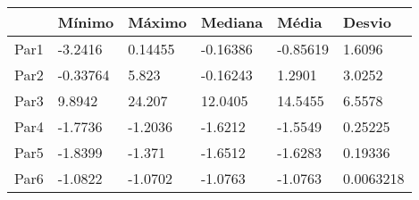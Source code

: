 \begin{tabular}{llllll}
& Mínimo & Máximo & Mediana & Média & Desvio \\ 
\hline 
Par1 & -3.2416 & 0.14455 & -0.16386 & -0.85619 & 1.6096 \\ 
Par2 & -0.33764 & 5.823 & -0.16243 & 1.2901 & 3.0252 \\ 
Par3 & 9.8942 & 24.207 & 12.0405 & 14.5455 & 6.5578 \\ 
Par4 & -1.7736 & -1.2036 & -1.6212 & -1.5549 & 0.25225 \\ 
Par5 & -1.8399 & -1.371 & -1.6512 & -1.6283 & 0.19336 \\ 
Par6 & -1.0822 & -1.0702 & -1.0763 & -1.0763 & 0.0063218 \\ 
\hline 
\end{tabular}